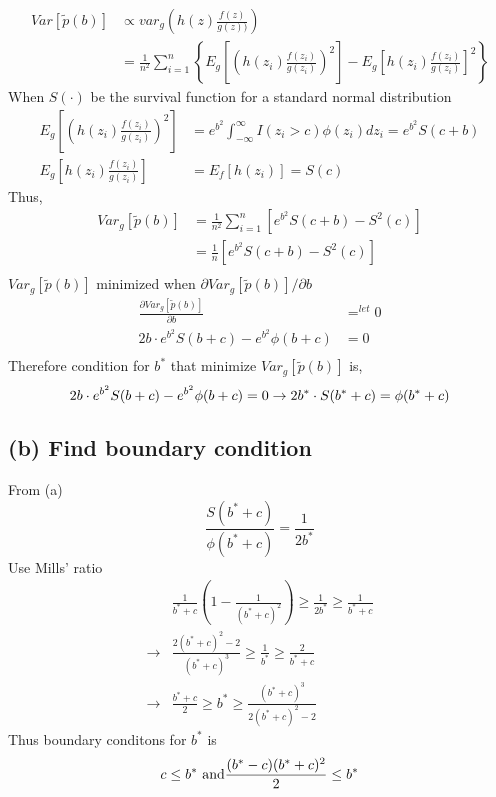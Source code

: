 \documentclass[11pt]{article}
\begin{document}
\[
\begin{align*}
Var[\tilde{p}(b)] &\propto var_g\left(h(z)\frac{f(z)}{g(z))}\right) \\
&=\frac{1}{n^2} \sum_{i=1}^{n}\left\{E_g\left[\left(h(z_i)\frac{f(z_i)}{g(z_i)}\right)^2\right] - E_g\left[h(z_i)\frac{f(z_i)}{g(z_i)}\right]^2\right\}
\end{align*}
\] When \(S(\cdot)\) be the survival function for a standard normal
distribution \[
\begin{align*}
E_g\left[\left(h(z_i)\frac{f(z_i)}{g(z_i)}\right)^2\right] &= e^{b^2}\int_{-\infty}^{\infty} I(z_i > c) \phi(z_i) dz_i = e^{b^2} S(c+b)\\
E_g\left[h(z_i)\frac{f(z_i)}{g(z_i)}\right] &= E_f[h(z_i)] = S(c)
\end{align*}
\] Thus, \[
\begin{align*}
Var_g[\tilde{p}(b)] &= \frac{1}{n^2} \sum_{i=1}^{n} \left[ e^{b^2} S(c+b) - S^2(c)\right]\\
&=\frac{1}{n}\left[ e^{b^2} S(c+b) - S^2(c)\right]\\
\end{align*}
\] \(Var_g[\tilde{p}(b)]\) minimized when
\(\partial Var_g[\tilde{p}(b)] / \partial b\) \[
\begin{align*}
\frac{\partial Var_g[\tilde{p}(b)]}{ \partial b}&=^{let}0\\
2b \cdot e^{b^2}S(b+c) - e^{b^2}\phi(b+c)&=0\\
\end{align*}
\] Therefore condition for \(b^*\) that minimize \(Var_g[\tilde{p}(b)]\)
is, \[
2b \cdot e^{b^2}S(b+c) - e^{b^2}\phi(b+c)=0\\
\rightarrow2b^*\cdot S(b^*+c) = \phi(b^*+c)
\]

    \subsection{(b) Find boundary
condition}\label{b-find-boundary-condition}

From (a) \[
\frac{S(b^*+c)}{\phi(b^*+c)} = \frac{1}{2b^*}
\] Use Mills' ratio \[
\begin{align*}
&\frac{1}{b^*+c}\left(1 - \frac{1}{(b^*+c)^2}\right) \ge \frac{1}{2b^*} \ge \frac{1}{b^*+c}\\
\rightarrow&\frac{2(b^*+c)^2-2}{(b^*+c)^3}\ge \frac{1}{b^*} \ge \frac{2}{b^*+c}\\
\rightarrow&\frac{b^*+c}{2} \ge b^* \ge\frac{(b^*+c)^3}{2(b^*+c)^2-2}
\end{align*}
\] Thus boundary conditons for \(b^*\) is \[
c \le b^* \text{ and}\\
\frac{(b^*-c)(b^*+c)^2}{2} \le b^*
\]
\end{document}
